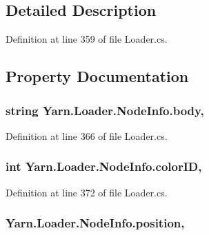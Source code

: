 \subsection{Detailed Description}


Definition at line 359 of file Loader.\-cs.



\subsection{Property Documentation}
\hypertarget{a00140_a18a8b97f2173fbcf8f3077582cc6e96e}{
\subsubsection[{body}]{\setlength{\rightskip}{0pt plus 5cm}string Yarn.\-Loader.\-Node\-Info.\-body\hspace{0.3cm}{\ttfamily [get]}, {\ttfamily [set]}}}\label{a00140_a18a8b97f2173fbcf8f3077582cc6e96e}


Definition at line 366 of file Loader.\-cs.

\hypertarget{a00140_a65f686e0170a9c50b97c4e4eedd1a093}{
\subsubsection[{color\-I\-D}]{\setlength{\rightskip}{0pt plus 5cm}int Yarn.\-Loader.\-Node\-Info.\-color\-I\-D\hspace{0.3cm}{\ttfamily [get]}, {\ttfamily [set]}}}\label{a00140_a65f686e0170a9c50b97c4e4eedd1a093}


Definition at line 372 of file Loader.\-cs.

\hypertarget{a00140_ac368ed021558af21c4abed88042c1aa8}{
\subsubsection[{position}]{ Yarn.\-Loader.\-Node\-Info.\-position\hspace{0.3cm}{\ttfamily [get]}, {\ttfamily [set]}}}\label{a00140_ac368ed021558af21c4abed88042c1aa8}


